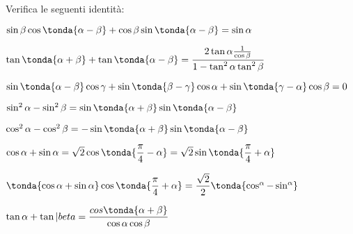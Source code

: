 \subsubsection*{}

\begin{esercizio}\label{ese:03.1}
Verifica le seguenti identità:
 \begin{enumeratea}
  \item \(\sin \beta \cos \tonda{\alpha - \beta} +
         \cos \beta \sin \tonda{\alpha - \beta} = \sin \alpha\)
  \item \(\tan \tonda{\alpha + \beta} + \tan \tonda{\alpha - \beta} =
         \dfrac{2 \tan \alpha \frac{1}{\cos \beta}}
               {1- \tan^2 \alpha \tan^2 \beta}\)
  \item \(\sin \tonda{\alpha - \beta} \cos \gamma +
         \sin \tonda{\beta - \gamma} \cos \alpha +
         \sin \tonda{\gamma - \alpha} \cos \beta = 0\)
  \item \(\sin^2 \alpha  - \sin^2 \beta = 
         \sin \tonda{\alpha + \beta} \sin \tonda{\alpha - \beta}\)
  \item \(\cos^2 \alpha  - \cos^2 \beta = 
         - \sin \tonda{\alpha + \beta} \sin \tonda{\alpha - \beta}\)
  \item \(\cos \alpha + \sin \alpha = 
  \sqrt{2} \cos \tonda{\dfrac{\pi}{4} - \alpha} = 
  \sqrt{2} \sin \tonda{\dfrac{\pi}{4} + \alpha}\)
  \item \(\tonda{\cos \alpha + \sin \alpha} 
         \cos \tonda{\dfrac{\pi}{4} + \alpha} =
         \dfrac{\sqrt{2}}{2} \tonda{\cos^ \alpha - \sin^ \alpha}\)
  \item \(\tan \alpha + \tan |beta =
         \dfrac{cos \tonda{\alpha + \beta}}{\cos \alpha \cos \beta}\)
 \end{enumeratea}
\end{esercizio}

\subsubsection*{}

